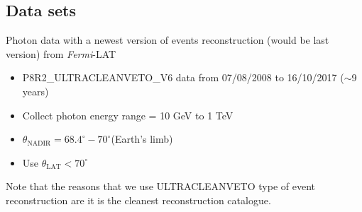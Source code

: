 \subsection{Data sets}
Photon data with a newest version of events reconstruction (would be last version) from \textit{Fermi}-LAT
\begin{itemize}
    \item P8R2\_ULTRACLEANVETO\_V6 data from 07/08/2008 to 16/10/2017 ($\sim$9 years)
    \item Collect photon energy range = 10 GeV to 1 TeV
    \item $\theta_{\text{NADIR}} = 68.4^\circ - 70^\circ$(Earth’s limb) 
    \item Use $\theta_{\text{LAT}} < 70^\circ$
\end{itemize}
Note that the reasons that we use ULTRACLEANVETO type of event reconstruction are it is the cleanest reconstruction catalogue.

